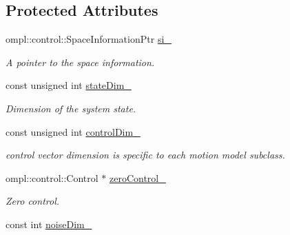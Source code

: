 \subsection*{\-Protected \-Attributes}
\begin{DoxyCompactItemize}
\item 
\hypertarget{class_motion_model_method_a7410df94d1231268c431dd73f2e5338d}{ompl\-::control\-::\-Space\-Information\-Ptr \hyperlink{class_motion_model_method_a7410df94d1231268c431dd73f2e5338d}{si\-\_\-}}\label{class_motion_model_method_a7410df94d1231268c431dd73f2e5338d}

\begin{DoxyCompactList}\small\item\em \-A pointer to the space information. \end{DoxyCompactList}\item 
\hypertarget{class_motion_model_method_a6d76506c342c3bf089eb548c531e2105}{const unsigned int \hyperlink{class_motion_model_method_a6d76506c342c3bf089eb548c531e2105}{state\-Dim\-\_\-}}\label{class_motion_model_method_a6d76506c342c3bf089eb548c531e2105}

\begin{DoxyCompactList}\small\item\em \-Dimension of the system state. \end{DoxyCompactList}\item 
\hypertarget{class_motion_model_method_ab9b45acbafce1f4c873ee7095bc49964}{const unsigned int \hyperlink{class_motion_model_method_ab9b45acbafce1f4c873ee7095bc49964}{control\-Dim\-\_\-}}\label{class_motion_model_method_ab9b45acbafce1f4c873ee7095bc49964}

\begin{DoxyCompactList}\small\item\em control vector dimension is specific to each motion model subclass. \end{DoxyCompactList}\item 
\hypertarget{class_motion_model_method_ae5e55aa39c0d819c3e9afffefa3d5b08}{ompl\-::control\-::\-Control $\ast$ \hyperlink{class_motion_model_method_ae5e55aa39c0d819c3e9afffefa3d5b08}{zero\-Control\-\_\-}}\label{class_motion_model_method_ae5e55aa39c0d819c3e9afffefa3d5b08}

\begin{DoxyCompactList}\small\item\em \-Zero control. \end{DoxyCompactList}\item 
\hypertarget{class_motion_model_method_a47725ad490fdc510cdc38838165b27c6}{const int \hyperlink{class_motion_model_method_a47725ad490fdc510cdc38838165b27c6}{noise\-Dim\-\_\-}}\label{class_motion_model_method_a47725ad490fdc510cdc38838165b27c6}


\end{DoxyCompactItemize}

